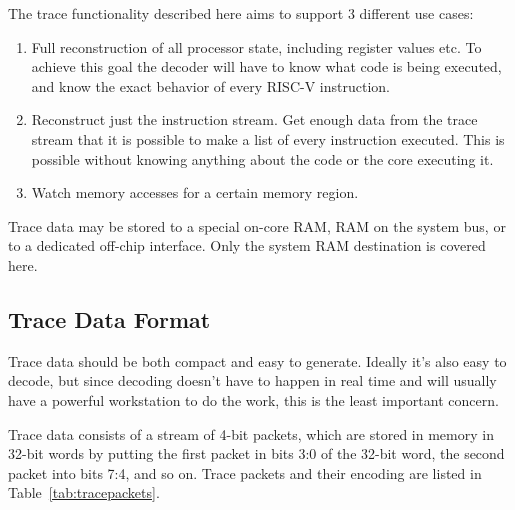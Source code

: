 \documentclass{article}
\begin{document}
The trace functionality described here aims to support 3 different use cases:
\begin{enumerate}
    \item Full reconstruction of all processor state, including register values
        etc. To achieve this goal the decoder will have to know what code is
        being executed, and know the exact behavior of every RISC-V
        instruction.
    \item Reconstruct just the instruction stream. Get enough data from the
        trace stream that it is possible to make a list of every instruction
        executed.  This is possible without knowing anything about the code or
        the core executing it.
    \item Watch memory accesses for a certain memory region.
\end{enumerate}

Trace data may be stored to a special on-core RAM, RAM on the system bus, or to
a dedicated off-chip interface. Only the system RAM destination is covered
here.

\subsection{Trace Data Format}

Trace data should be both compact and easy to generate. Ideally it's also easy
to decode, but since decoding doesn't have to happen in real time and will
usually have a powerful workstation to do the work, this is the least important
concern.

Trace data consists of a stream of 4-bit packets, which are stored in memory in
32-bit words by putting the first packet in bits 3:0 of the 32-bit word, the
second packet into bits 7:4, and so on. Trace packets and their encoding are
listed in Table~\ref{tab:tracepackets}.
\end{document}
